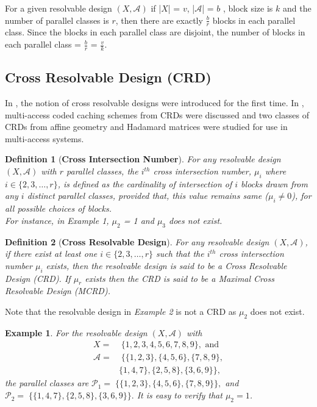 \documentclass[conference]{IEEEtran}
\newtheorem{defn}{Definition}
\newtheorem{exmp}{Example}
\begin{document}
	For a given resolvable design  $(X, \mathcal{A})$ if |$X$| = $v$, |$\mathcal{A}$| = $b$ , block size is $k$ and the number of parallel classes is $r$, then there are exactly $\frac{b}{r}$ blocks in each parallel class. Since the blocks in each parallel class are disjoint, the number of blocks in each parallel class = $\frac{b}{r}$ = $\frac{v}{k}$.
\subsection{Cross Resolvable Design (CRD)\cite{KNRarXiv}}
	In \cite{KNRarXiv}, the notion of cross resolvable designs were introduced for the first time. In \cite{KNRarXiv}, multi-access coded caching schemes from CRDs were discussed and two classes of CRDs from affine geometry and Hadamard matrices were studied for use in multi-access systems.
\begin{defn}[\textbf{Cross Intersection Number}]
		For any resolvable design $(X, \mathcal{A})$ with $r$ parallel classes, the $i^{th}$ cross intersection number, $\mu_{i}$ where $i \in \{2, 3, \dots,r\}$, is defined as the cardinality of intersection of $i$ blocks drawn from any $i$ distinct parallel classes, provided that, this value remains same ($\mu_i\neq 0$), for all possible choices of blocks. \\	
		For instance, in Example 1, $\mu_{2}$ = 1 and  $\mu_{3}$ does not exist. 
	\end{defn}
\begin{defn}[\textbf{Cross Resolvable Design}]
		For any resolvable design $(X, \mathcal{A})$, if there exist at least one $i\in \{2,3,\dots,r\}$ such that the $i^{th}$ cross intersection number $\mu_{i}$ exists, then the resolvable design is said to be a Cross Resolvable Design (CRD). 
If $\mu_r$ exists then the CRD is said to be a Maximal Cross Resolvable Design (MCRD).
\end{defn}
Note that the resolvable design in \textit{Example 2} is not a CRD  as $\mu_{2}$ does not exist.
\begin{exmp}
		\label{exmp3}
		For the resolvable design $(X, \mathcal{A})$ with
		\begin{align*}
		X = &\;\{1, 2, 3, 4, 5, 6, 7, 8, 9\}, \text{ and} \\
		\mathcal{A} =& \;\{\{1, 2, 3\},\{4, 5, 6\},\{7, 8, 9\},\\
		&\{1, 4, 7\},\{2, 5, 8\},\{3, 6, 9\}\},
		\end{align*}
		the parallel classes are 
		$\mathcal{P}_1 = \;\{\{1, 2, 3\},\{4, 5, 6\},\{7, 8, 9\}\},$  and
		$\mathcal{P}_2 =\; \{\{1, 4, 7\},\{2, 5, 8\},\{3, 6, 9\}\}.$
		It is easy to verify that  $\mu_{2} = 1$.	
\end{exmp}
\end{document}

